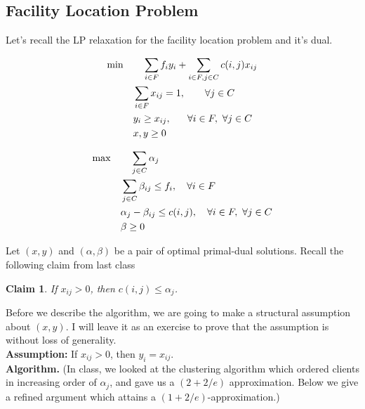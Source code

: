 \documentclass[11pt]{article}
\newtheorem{claim}{Claim}
\newlength{\lpbox}
\begin{document}
\subsection*{Facility Location Problem}
Let's recall the LP relaxation for the facility location problem and it's dual. 
\begin{figure}[h]
  \begin{minipage}{\lpbox} \begin{align}
   \min & \qquad \sum_{i\in F}f_iy_i + \sum_{i\in F,j\in C} c(i,j)x_{ij}   \label{lp:ufl} \\
 & \quad \sum_{i\in F} x_{ij} = 1, ~~~~~~ \forall j\in C \label{eq:client} \\
			     & \quad y_i \ge x_{ij}, ~~~~~\forall i\in F,~\forall j\in C \label{eq:fac-client}	 \\
			     & \quad x,y \ge 0 \notag 
    \end{align} 
  \end{minipage}
  \hfill \vline \hfill
  \begin{minipage}{\lpbox} \begin{align}
  \max & \qquad \sum_{j\in C}\alpha_j  \label{dual:ufl}\\
 & \quad \sum_{j\in C} \beta_{ij} \le f_i, ~~~\forall i\in F \label{eq:fac-cost} \\
			     & \quad \alpha_j -\beta_{ij} \le c(i,j), ~~~\forall i\in F,~\forall j\in C \label{eq:client-cost}  \\
			     &\quad \beta \ge 0 \notag
			       \end{align}\end{minipage}
\end{figure}
\noindent
Let $(x,y)$ and $(\alpha,\beta)$ be a pair of optimal primal-dual solutions. Recall the following claim from last class

\begin{claim}\label{claim:cs}
If $x_{ij} > 0$, then $c(i,j) \le \alpha_j$.
\end{claim}

Before we describe the algorithm, we are going to make a structural assumption about $(x,y)$.
I will leave it as an exercise to prove that the assumption is without loss of generality. \\

\noindent
{\bf Assumption:} If $x_{ij} > 0$, then $y_i = x_{ij}$. \\


\noindent
{\bf Algorithm.} 
(In class, we looked at the clustering algorithm which ordered clients in increasing order of $\alpha_j$, and gave us a 
$(2+2/e)$ approximation. Below we give a refined argument which attains a $(1+2/e)$-approximation.) \\
\end{document}
